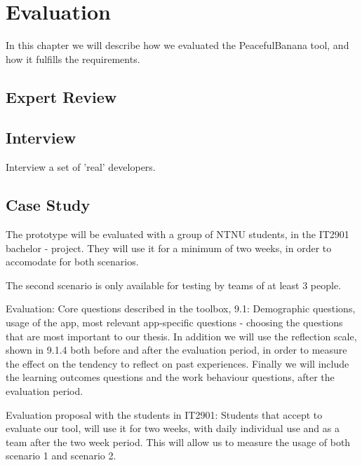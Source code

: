 \chapter{Evaluation}
In this chapter we will describe how we evaluated the PeacefulBanana tool, and how it fulfills the requirements.


\section{Expert Review}

\section{Interview}
Interview a set of 'real' developers.

\section{Case Study}
The prototype will be evaluated with a group of NTNU students, in the IT2901 bachelor - project. They will use it for a minimum of two weeks, in order to accomodate for both scenarios.

The second scenario is only available for testing by teams of at least 3 people.

Evaluation:
Core questions described in the toolbox, 9.1:
Demographic questions, usage of the app, most relevant app-specific questions - choosing the questions that are most important to our thesis. 
In addition we will use the reflection scale, shown in 9.1.4 both before and after the evaluation period, in order to measure the effect on the tendency to reflect on past
experiences. Finally we will include the learning outcomes questions and the work behaviour questions, after the evaluation period. 

Evaluation proposal with the students in IT2901: 
Students that accept to evaluate our tool, will use it for two weeks, with daily individual use and as a team after the two week period. This will allow us to measure the
usage of both scenario 1 and scenario 2.

